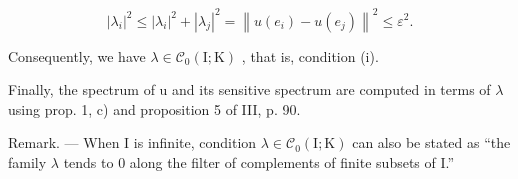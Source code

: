 \[
\left| \lambda_ {i} \right| ^ {2} \leqslant \left| \lambda_ {i} \right| ^ {2} + \left| \lambda_ {j} \right| ^ {2} = \left\| u \left(e _ {i}\right) - u \left(e _ {j}\right) \right\| ^ {2} \leqslant \varepsilon^ {2}.
\]

Consequently, we have \(\lambda \in \mathcal{C}_0(\mathrm{I};\mathrm{K})\) , that is, condition (i).

Finally, the spectrum of u and its sensitive spectrum are computed in terms of \(\lambda\) using prop. 1, c) and proposition 5 of III, p. 90.

Remark. --- When I is infinite, condition \(\lambda\in\mathcal{C}_{0}(\mathrm{I};\mathrm{K})\) can also be stated as “the family \(\lambda\) tends to 0 along the filter of complements of finite subsets of I.”

